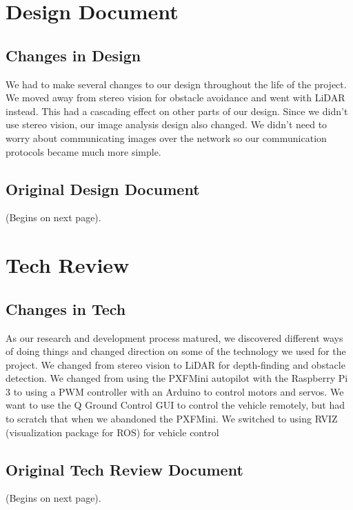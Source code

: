 \documentclass[compsoc,draftclsnofoot,onecolumn,10pt]{IEEEtran}
\begin{document}
\clearpage
\section{Design Document}
\subsection{Changes in Design}
We had to make several changes to our design throughout the life of the project. 
We moved away from stereo vision for obstacle avoidance and went with LiDAR instead. 
This had a cascading effect on other parts of our design. Since we didn't use stereo vision, our image analysis design also changed. 
We didn't need to worry about communicating images over the network so our communication protocols became much more simple.

\subsection{Original Design Document}
(Begins on next page).




\clearpage 
\section{Tech Review}
\subsection{Changes in Tech}
As our research and development process matured, we discovered different ways of doing things and changed direction on some of the technology we used for the project. 
We changed from stereo vision to LiDAR for depth-finding and obstacle detection. 
We changed from using the PXFMini autopilot with the Raspberry Pi 3 to using a PWM controller with an Arduino to control motors and servos. 
We want to use the Q Ground Control GUI to control the vehicle remotely, but had to scratch that when we abandoned the PXFMini. 
We switched to using RVIZ (visualization package for ROS) for vehicle control

\subsection{Original Tech Review Document}
(Begins on next page).

\end{document}
